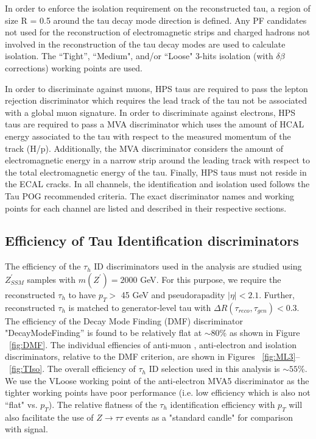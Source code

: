 In order to enforce the isolation requirement on the reconstructed tau, a region of size R = 0.5 around the tau decay 
mode direction is defined. Any PF candidates not used for the reconstruction of electromagnetic strips and charged 
hadrons not involved in the reconstruction of the tau decay modes are used to calculate isolation. The ``Tight'', ``Medium", and/or ``Loose" 3-hits isolation 
(with $\delta\beta$ corrections)  working points are used. 

In order to discriminate against muons, HPS taus are required to pass the lepton rejection 
discriminator which requires the lead track of the tau not be associated with a global muon signature. In order to 
discriminate against electrons, HPS taus are required to pass a MVA discriminator which uses the amount of HCAL energy 
associated to the tau with respect to the measured momentum of the track (H/p). Additionally, the MVA discriminator 
considers the amount of electromagnetic energy in a narrow strip around the leading track with respect to the total 
electromagnetic energy of the tau. Finally, HPS taus must not reside in the ECAL cracks. 
In all channels, the identification and isolation used follows the Tau POG recommended criteria.
The exact discriminator names and working points for each channel are listed and described in their respective sections.




\subsection{Efficiency of Tau Identification discriminators} \label{sec:tauIDeff}
The efficiency of the $\tau_{h}$ ID discriminators used in the analysis are studied using $Z^{\prime}_{SSM}$ samples with $m(Z^{\prime}) = 2000$ GeV. For this purpose, we require the reconstructed $\tau_{h}$ to have $p_{T} >$ 45 GeV and pseudorapadity $|\eta| < 2.1$. Further, reconstructed $\tau_{h}$ is matched to generator-level tau with $\Delta R(\tau_{reco},\tau_{gen}) < 0.3$. The efficiency of the Decay Mode Finding (DMF) discriminator  "DecayModeFinding'' is found to be relatively flat at $\sim 80$\% as shown in Figure ~\ref{fig:DMF}. The individual effiencies of anti-muon , anti-electron and isolation discriminators, relative to the DMF criterion, are shown in Figures ~\ref{fig:ML3}--~\ref{fig:TIso}. The overall efficiency of $\tau_{h}$ ID selection used in this analysis is $\sim 55$\%. We use the VLoose working point of the anti-electron MVA5 discriminator as the tighter working points have poor performance (i.e. low efficiency which is also not ``flat" vs. $p_{T}$). The relative flatness of the $\tau_{h}$ identification efficiency with $p_{T}$ will also facilitate the use of $Z\rightarrow\tau\tau$ events as a "standard candle" for comparison with signal. 

